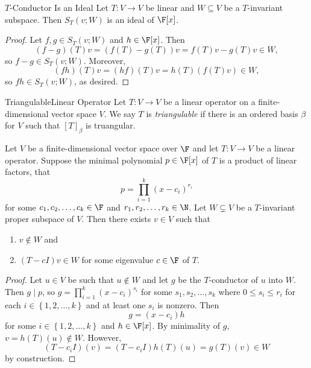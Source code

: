 \documentclass[linearalgebra]{subfiles}
\begin{document}
    \begin{prop}{$T$-Conductor Is an Ideal}
        Let $T:V\to V$ be linear and $W\subseteq V$ be a $T$-invariant subspace. Then $S_T(v; W)$ is an ideal of $\F[x]$.
    \end{prop}

    \begin{proof}
        Let $f,g\in S_T(v; W)$ and $h\in \F[x]$. Then
        \begin{equation*}
            (f-g)(T)v = \left( f(T)-g(T) \right) v = f(T)v - g(T)v\in W,
        \end{equation*}
        so $f-g\in S_T(v; W)$. Moreover,
        \begin{equation*}
            (fh)(T)v = (hf)(T)v = h(T)\left( f(T)v \right) \in W,
        \end{equation*}
        so $fh\in S_T(v; W)$, as desired.
    \end{proof}

    \begin{definition}{Triangulable}{Linear Operator}
        Let $T:V\to V$ be a linear operator on a finite-dimensional vector space $V$. We say $T$ is \emph{triangulable} if there is an ordered basis $\beta$ for $V$ such that $[T]_\beta$ is truangular.
    \end{definition}
    
    \begin{prop}{}
        Let $V$ be a finite-dimensional vector space over $\F$ and let $T:V\to V$ be a linear operator. Suppose the minimal polynomial $p\in\F[x]$ of $T$ is a product of linear factors, that
        \begin{equation*}
            p = \prod^{k}_{i=1} (x-c_i)^{r_i}
        \end{equation*}
        for some $c_1, c_2, \ldots, c_k\in \F$ and $r_1, r_2, \ldots, r_k\in \N$. Let $W\subsetneq V$ be a $T$-invariant proper subspace of $V$. Then there exists $v\in V$ such that
        \begin{enumerate}
            \item $v\notin W$ and
            \item $(T-cI)v\in W$ for some eigenvalue $c\in\F$ of $T$.
        \end{enumerate}
    \end{prop}

    \begin{proof}
        Let $u\in V$ be such that $u\notin W$ and let $g$ be the $T$-conductor of $u$ into $W$. Then $g\mid p$, so $g = \prod^{k}_{i=1} (x-c_i)^{s_i}$ for some $s_1, s_2, \ldots, s_k$ where $0\leq s_i\leq r_i$ for each $i\in \left\lbrace 1, 2, \ldots, k \right\rbrace$ and at least one $s_i$ is nonzero. Then
        \begin{equation*}
            g = (x-c_i)h
        \end{equation*}
        for some $i\in \left\lbrace 1, 2, \ldots, k \right\rbrace$ and $h\in \F[x]$. By minimality of $g$, $v = h(T)(u)\notin W$. However,
        \begin{equation*}
            (T-c_iI)(v) = \left( T-c_iI \right)h(T)(u) = g(T)(v) \in W 
        \end{equation*}
        by construction.
    \end{proof}
\end{document}
